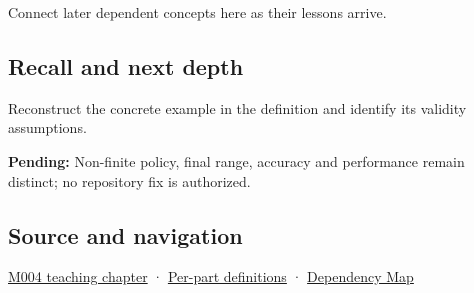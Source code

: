 Connect later dependent concepts here as their lessons arrive.

\subsection{Recall and next depth}\label{appendix-7f1e17dcafb1-recall-and-next-depth}

Reconstruct the concrete example in the definition and identify its validity assumptions.

\textbf{Pending:} Non-finite policy, final range, accuracy and performance remain distinct; no repository fix is authorized.

\subsection{Source and navigation}\label{appendix-7f1e17dcafb1-source-and-navigation}

\hyperref[01-foundations-i-ch001-a-stretching-ruler-for-real-valued-quantities]{M004 teaching chapter} · \hyperref[appendix-fd090d982a15-m004---parts-61-76]{Per-part definitions} · \hyperref[appendix-4ad47bdd269a]{Dependency Map}
